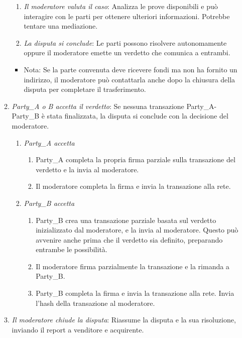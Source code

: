 \begin{enumerate}
\begin{enumerate}
\begin{enumerate}
            \item {\em Il moderatore valuta il caso}: Analizza le prove disponibili e può interagire con le parti per ottenere ulteriori informazioni. Potrebbe tentare una mediazione.
            \item {\em La disputa si conclude}: Le parti possono risolvere autonomamente oppure il moderatore emette un verdetto che comunica a entrambi.
        \end{enumerate}{}
        \begin{itemize}
            \item Nota: Se la parte convenuta deve ricevere fondi ma non ha fornito un indirizzo, il moderatore può contattarla anche dopo la chiusura della disputa per completare il trasferimento.
        \end{itemize}{}        
        \item {\em Party\_A o B accetta il verdetto}: Se nessuna transazione Party\_A-Party\_B è stata finalizzata, la disputa si conclude con la decisione del moderatore.
        \begin{enumerate}
            \item {\em Party\_A accetta}
            \begin{enumerate}
                \item Party\_A completa la propria firma parziale sulla transazione del verdetto e la invia al moderatore.
                \item Il moderatore completa la firma e invia la transazione alla rete.
            \end{enumerate}{}
            \item {\em Party\_B accetta}
            \begin{enumerate}
                \item Party\_B crea una transazione parziale basata sul verdetto inizializzato dal moderatore, e la invia al moderatore. Questo può avvenire anche prima che il verdetto sia definito, preparando entrambe le possibilità.
                \item Il moderatore firma parzialmente la transazione e la rimanda a Party\_B.
                \item Party\_B completa la firma e invia la transazione alla rete. Invia l’hash della transazione al moderatore.
            \end{enumerate}{}
        \end{enumerate}{}
        \item {\em Il moderatore chiude la disputa}: Riassume la disputa e la sua risoluzione, inviando il report a venditore e acquirente.
    \end{enumerate}{}
\end{enumerate}{}

